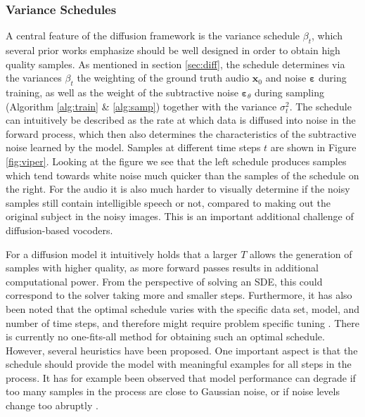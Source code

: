 \documentclass{report}
\begin{document}
\subsubsection{Variance Schedules}
A central feature of the diffusion framework is the variance schedule $\beta_t$, which several prior works emphasize should be well designed in order to obtain high quality samples. As mentioned in section \ref{sec:diff}, the schedule determines via the variances $\beta_t$ the weighting of the ground truth audio $\bm{x}_0$ and noise $\bm{\varepsilon}$ during training, as well as the weight of the subtractive noise $\bm{\varepsilon}_{\theta}$ during sampling (Algorithm \ref{alg:train} \& \ref{alg:samp}) together with the variance $\sigma_t^2$. The schedule can intuitively be described as the rate at which data is diffused into noise in the forward process, which then also determines the characteristics of the subtractive noise learned by the model. Samples at different time steps $t$ are shown in Figure \ref{fig:viper}. Looking at the figure we see that the left schedule produces samples which tend towards white noise much quicker than the samples of the schedule on the right. For the audio it is also much harder to visually determine if the noisy samples still contain intelligible speech or not, compared to making out the original subject in the noisy images. This is an important additional challenge of diffusion-based vocoders.

For a diffusion model it intuitively holds that a larger $T$ allows the generation of samples with higher quality, as more forward passes results in additional computational power. From the perspective of solving an SDE, this could correspond to the solver taking more and smaller steps. Furthermore, it has also been noted that the optimal schedule varies with the specific data set, model, and number of time steps, and therefore might require problem specific tuning \cite{lam2022bddm, chen2020wavegrad}. There is currently no one-fits-all method for obtaining such an optimal schedule. However, several heuristics have been proposed. One important aspect is that the schedule should provide the model with meaningful examples for all steps in the process. It has for example been observed that model performance can degrade if too many samples in the process are close to Gaussian noise, or if noise levels change too abruptly \cite{nichol2021improved}. 
\end{document}
